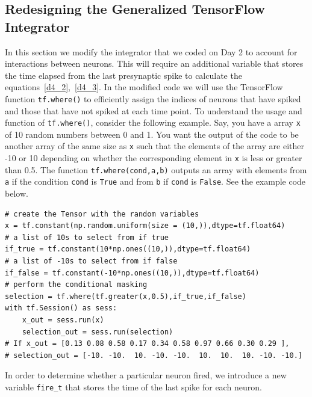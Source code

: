 \documentclass[10pt,letterpaper]{article}
\begin{document}
\subsection*{Redesigning the Generalized TensorFlow Integrator}
In this section we modify the integrator that we coded on Day 2 to account for interactions between neurons. This will require an additional variable that stores the time elapsed from the last presynaptic spike to calculate the  equations~\ref{d4_2},~\ref{d4_3}. In the modified code we will use the TensorFlow function \texttt{tf.where()} to efficiently assign the indices of neurons that have spiked and those that have not spiked at each time point. To understand the usage and function of \texttt{tf.where()}, consider the following example. Say, you have a array \texttt{x} of 10 random numbers between 0 and 1. You want the output of the code to be another array of the same size as \texttt{x} such that the elements of the array are either -10 or 10 depending on whether the corresponding element in \texttt{x} is less or greater than 0.5. The function  \texttt{tf.where(cond,a,b)} outputs an array with elements from \texttt{a} if the condition \texttt{cond} is \texttt{True} and from \texttt{b} if \texttt{cond} is \texttt{False}. See the example code below.

\begin{verbatim}
# create the Tensor with the random variables
x = tf.constant(np.random.uniform(size = (10,)),dtype=tf.float64)
# a list of 10s to select from if true
if_true = tf.constant(10*np.ones((10,)),dtype=tf.float64)
# a list of -10s to select from if false
if_false = tf.constant(-10*np.ones((10,)),dtype=tf.float64)
# perform the conditional masking
selection = tf.where(tf.greater(x,0.5),if_true,if_false)
with tf.Session() as sess:
    x_out = sess.run(x)
    selection_out = sess.run(selection)
# If x_out = [0.13 0.08 0.58 0.17 0.34 0.58 0.97 0.66 0.30 0.29 ],
# selection_out = [-10. -10.  10. -10. -10.  10.  10.  10. -10. -10.]
\end{verbatim}

In order to determine whether a particular neuron fired, we introduce a new variable \texttt{fire\_t} that stores the time of the last spike for each neuron. 
\end{document}
